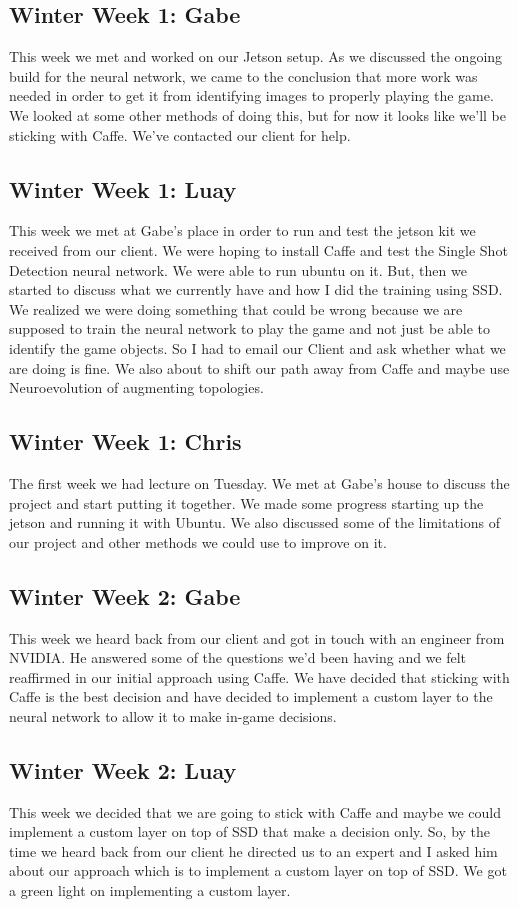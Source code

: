 \documentclass[onecolumn, draftclsnofoot,10pt, compsoc]{IEEEtran}
\begin{document}
\subsection{Winter Week 1: Gabe}
This week we met and worked on our Jetson setup. As we discussed the ongoing build for the neural network, we came to the conclusion that more work was needed in order to get it from identifying images to properly playing the game. We looked at some other methods of doing this, but for now it looks like we'll be sticking with Caffe. We've contacted our client for help.
\subsection{Winter Week 1: Luay}
This week we met at Gabe's place in order to run and test the jetson kit we received from our client. We were hoping to install Caffe and test the Single Shot Detection neural network. We were able to run ubuntu on it. But, then we started to discuss what we currently have and how I did the training using SSD. We realized we were doing something that could be wrong because we are supposed to train the neural network to play the game and not just be able to identify the game objects. So I had to email our Client and ask whether what we are doing is fine. We also about to shift our path away from Caffe and maybe use Neuroevolution of augmenting topologies.
\subsection{Winter Week 1: Chris}
The first week we had lecture on Tuesday. We met at Gabe's house to discuss the project and start putting it together. We made some progress starting up the jetson and running it with Ubuntu. We also discussed some of the limitations of our project and other methods we could use to improve on it.
\subsection{Winter Week 2: Gabe}
This week we heard back from our client and got in touch with an engineer from NVIDIA. He answered some of the questions we'd been having and we felt reaffirmed in our initial approach using Caffe. We have decided that sticking with Caffe is the best decision and have decided to implement a custom layer to the neural network to allow it to make in-game decisions.
\subsection{Winter Week 2: Luay}
This week we decided that we are going to stick with Caffe and maybe we could implement a custom layer on top of SSD that make a decision only. So, by the time we heard back from our client he directed us to an expert and I asked him about our approach which is to implement a custom layer on top of SSD. We got a green light on implementing a custom layer.
\end{document}
